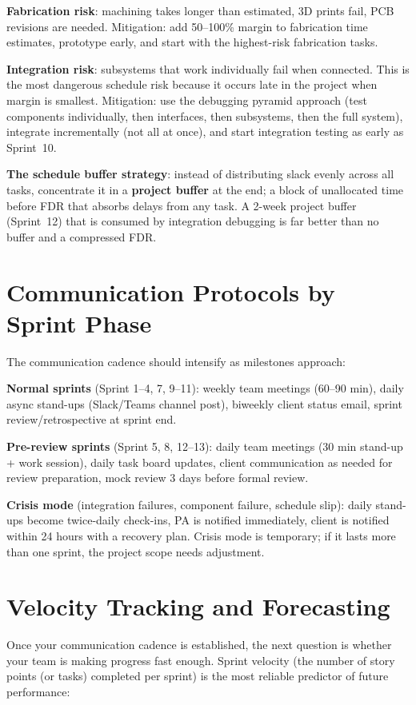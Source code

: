 \textbf{Fabrication risk}: machining takes longer than estimated, 3D prints fail, PCB revisions are needed. Mitigation: add 50--100\% margin to fabrication time estimates, prototype early, and start with the highest-risk fabrication tasks.

\textbf{Integration risk}: subsystems that work individually fail when connected. This is the most dangerous schedule risk because it occurs late in the project when margin is smallest. Mitigation: use the debugging pyramid approach (test components individually, then interfaces, then subsystems, then the full system), integrate incrementally (not all at once), and start integration testing as early as Sprint~10.

\textbf{The schedule buffer strategy}: instead of distributing slack evenly across all tasks, concentrate it in a \textbf{project buffer} at the end; a block of unallocated time before FDR that absorbs delays from any task. A 2-week project buffer (Sprint~12) that is consumed by integration debugging is far better than no buffer and a compressed FDR.



\section{Communication Protocols by Sprint Phase}
The communication cadence should intensify as milestones approach:

\textbf{Normal sprints} (Sprint 1--4, 7, 9--11): weekly team meetings (60--90 min), daily async stand-ups (Slack/Teams channel post), biweekly client status email, sprint review/retrospective at sprint end.

\textbf{Pre-review sprints} (Sprint 5, 8, 12--13): daily team meetings (30 min stand-up + work session), daily task board updates, client communication as needed for review preparation, mock review 3 days before formal review.

\textbf{Crisis mode} (integration failures, component failure, schedule slip): daily stand-ups become twice-daily check-ins, PA is notified immediately, client is notified within 24 hours with a recovery plan. Crisis mode is temporary; if it lasts more than one sprint, the project scope needs adjustment.

\section{Velocity Tracking and Forecasting}
Once your communication cadence is established, the next question is whether your team is making progress fast enough. Sprint velocity (the number of story points (or tasks) completed per sprint) is the most reliable predictor of future performance:

